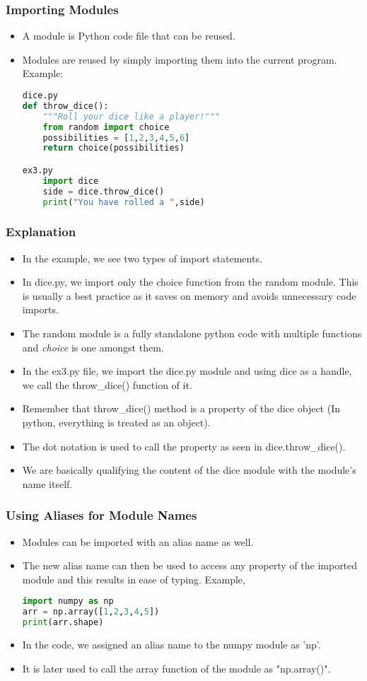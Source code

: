 \documentclass{beamer}
\begin{document}
\begin{frame}[fragile]
\frametitle{Importing Modules}
\begin{itemize}
\item A module is Python code file that can be reused.
\item Modules are reused by simply importing them into the current program. Example:
\begin{lstlisting}[language=Python]
dice.py
def throw_dice():
	"""Roll your dice like a player!"""
	from random import choice
	possibilities = [1,2,3,4,5,6]
	return choice(possibilities)

ex3.py
	import dice
	side = dice.throw_dice()
	print("You have rolled a ",side)
\end{lstlisting}
\end{itemize}
\end{frame}

\begin{frame}[fragile]
\frametitle{Explanation}
\begin{itemize}
\item In the example, we see two types of import statements.
\item In dice.py, we import only the choice function from the random module. This is usually a best practice as it saves on memory and avoids unnecessary code imports.
\item The random module is a fully standalone python code  with multiple functions and \textit{choice} is one amongst them.
\item In the ex3.py file, we import the dice.py module and using dice as a handle, we call the throw\_dice() function of it.
\item Remember that throw\_dice() method is a property  of the dice object (In python, everything is treated as an object).
\item The dot notation is used to call the property as seen in dice.throw\_dice().
\item We are basically qualifying the content of the dice module with the module's name itself.
\end{itemize}
\end{frame}

\begin{frame}[fragile]
\frametitle{Using Aliases for Module Names}
\begin{itemize}
\item Modules can be imported with an alias name as well.
\item The new alias name can then be used to access any property of the imported module and this results in ease of typing.
Example,
\begin{lstlisting}[language=Python]
import numpy as np
arr = np.array([1,2,3,4,5])
print(arr.shape)
\end{lstlisting}
\item In the code, we assigned an alias name to the numpy module as 'np'.
\item It is later used to call the array function of the module as "np.array()".
\end{itemize}
\end{frame}
\end{document}
